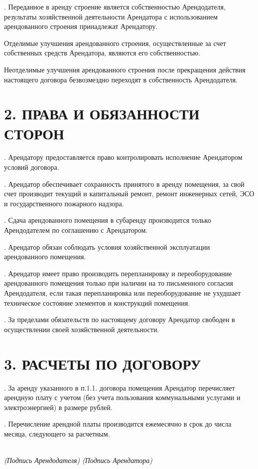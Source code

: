 . Переданное в аренду строение является собственностью Арендодателя, результаты хозяйственной деятельности Арендатора с использованием арендованного строения принадлежат Арендатору.

\noindent
Отделимые улучшения арендованного строения, осуществленные за счет собственных средств Арендатора, являются его собственностью.

\noindent
Неотделимые улучшения арендованного строения после прекращения действия настоящего договора безвозмездно переходят в собственность Арендодателя.


\section*{2. ПРАВА И ОБЯЗАННОСТИ СТОРОН}

. Арендатору предоставляется право контролировать исполнение Арендатором условий договора.

. Арендатор обеспечивает сохранность принятого в аренду помещения, за свой счет производит текущий и капитальный ремонт, ремонт инженерных сетей, ЭСО и государственного пожарного надзора.

. Сдача арендованного помещения в субаренду производится только Арендодателем по соглашению с Арендатором.

. Арендатор обязан соблюдать условия хозяйственной эксплуатации арендованного помещения.

. Арендатор имеет право производить перепланировку и переоборудование арендованного помещения только при наличии на то письменного согласия Арендодателя, если такая перепланировка или переоборудование не ухудшает техническое состояние элементов и конструкций помещения.

. За пределами обязательств по настоящему договору Арендатор свободен в осуществлении своей хозяйственной деятельности.

\section*{3. РАСЧЕТЫ ПО ДОГОВОРУ}

. За аренду указанного в п.1.1. договора помещения Арендатор перечисляет арендную плату с учетом (без учета пользования коммунальными услугами и электроэнергией) в размере \textbf{  } рублей.

. Перечисление арендной платы производится ежемесячно в срок до \textbf{  } числа месяца, следующего за расчетным.

\vfill

\noindent
\underline{\hspace{5cm}} \hspace{6.7cm} \underline{\hspace{5cm}} \\
\textit{(Подпись Арендодателя)} \hspace{8cm} \textit{(Подпись Арендатора)}

